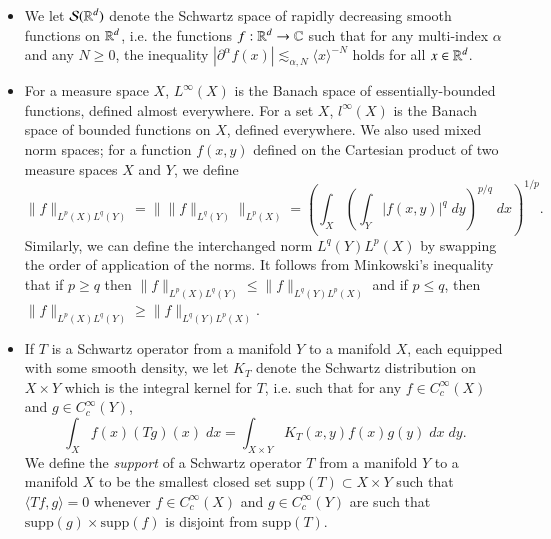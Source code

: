 \begin{itemize}
    \item We let $\mathcal{S}(\operatorname{\mathbb{R}}^d)$ denote the Schwartz space of rapidly decreasing smooth functions on $\operatorname{\mathbb{R}}^d$, i.e. the functions $f: \operatorname{\mathbb{R}}^d \to \operatorname{\mathbb{C}}$ such that for any multi-index $\alpha$ and any $N \geq 0$, the inequality $|\partial^\alpha f(x)| \lesssim_{\alpha,N} \langle x \rangle^{-N}$ holds for all $x \in \operatorname{\mathbb{R}}^d$.

    \item For a measure space $X$, $L^\infty(X)$ is the Banach space of essentially-bounded functions, defined almost everywhere. For a set $X$, $l^\infty(X)$ is the Banach space of bounded functions on $X$, defined everywhere. We also used mixed norm spaces; for a function $f(x,y)$ defined on the Cartesian product of two measure spaces $X$ and $Y$, we define
    \[ \| f \|_{L^p(X) L^q(Y)} = \big\| \| f \|_{L^q(Y)} \big\|_{L^p(X)} = \left( \int\nolimits_X \left( \int\nolimits_Y |f(x,y)|^q\; dy \right)^{p/q}\; dx \right)^{1/p}. \]
    Similarly, we can define the interchanged norm $L^q(Y) L^p(X)$ by swapping the order of application of the norms. It follows from Minkowski's inequality that if $p \geq q$ then $\| f \|_{L^p(X) L^q(Y)} \leq \| f \|_{L^q(Y) L^p(X)}$ and if $p \leq q$, then $\| f \|_{L^p(X) L^q(Y)} \geq \| f \|_{L^q(Y) L^p(X)}$.

    \item If $T$ is a Schwartz operator from a manifold $Y$ to a manifold $X$, each equipped with some smooth density, we let $K_T$ denote the Schwartz distribution on $X \times Y$ which is the integral kernel for $T$, i.e. such that for any $f \in C_c^\infty(X)$ and $g \in C_c^\infty(Y)$,
    \[ \int_X f(x) (Tg)(x)\; dx = \int_{X \times Y} K_T(x,y) f(x) g(y)\; dx\; dy. \]
    We define the \emph{support} of a Schwartz operator $T$ from a manifold $Y$ to a manifold $X$ to be the smallest closed set $\text{supp}(T) \subset X \times Y$ such that $\langle Tf, g \rangle = 0$ whenever $f \in C_c^\infty(X)$ and $g \in C_c^\infty(Y)$ are such that $\text{supp}(g) \times \text{supp}(f)$ is disjoint from $\text{supp}(T)$.



\end{itemize}
